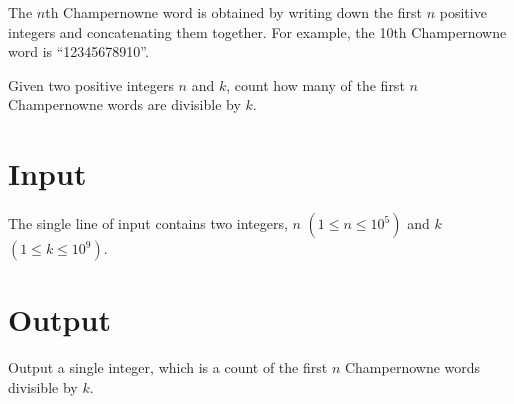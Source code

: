 
The $n$th Champernowne word is obtained by writing down the first $n$
positive integers and concatenating them together. For example, the
10th Champernowne word is ``12345678910''.

Given two positive integers $n$ and $k$, count how many of the first $n$ Champernowne words are divisible by $k$.

\section*{Input}

The single line of input contains two integers, $n$ $(1 \le n \le 10^5)$ and $k$ $(1 \le k \le 10^9)$.

\section*{Output}

Output a single integer, which is a count of the first $n$ Champernowne words divisible by $k$.

